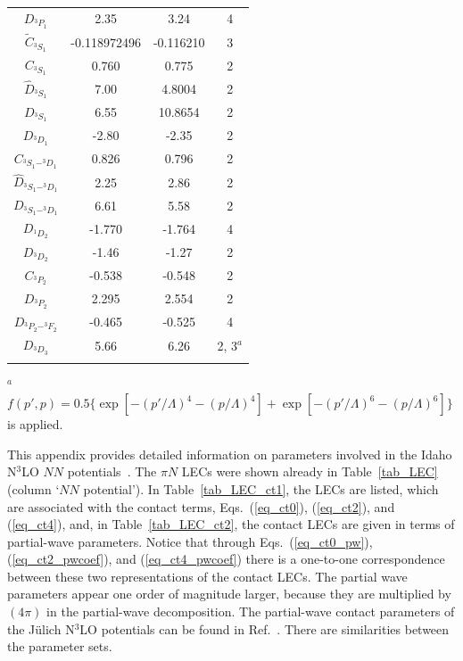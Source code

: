 \documentclass[sort&compress,preprint,3p]{elsarticle}
\begin{document}
\begin{table}[t]
\begin{tabular*}{\textwidth}{@{\extracolsep{\fill}}cccc}
  $D_{^3P_1}$   & 2.35     & 3.24 & 4 \\
 $\widetilde{C}_{^3S_1}$   &-0.118972496 & -0.116210 & 3 \\
  $C_{^3S_1}$   & 0.760    & 0.775 & 2 \\
 $\widehat{D}_{^3S_1}$    & 7.00    & 4.8004 &  2 \\
  $D_{^3S_1}$   & 6.55     & 10.8654 & 2 \\
  $D_{^3D_1}$   &-2.80    & -2.35 &  2 \\
  $C_{^3S_1-^3D_1}$  &0.826    & 0.796 & 2 \\
  $\widehat{D}_{^3S_1-^3D_1}$  &2.25    & 2.86 & 2 \\
  $D_{^3S_1-^3D_1}$  &6.61     & 5.58 & 2 \\
  $D_{^1D_2}$   &-1.770     & -1.764 & 4 \\
  $D_{^3D_2}$   &-1.46   & -1.27 &  2 \\
  $C_{^3P_2}$   &-0.538  & -0.548 &  2 \\
  $D_{^3P_2}$   & 2.295  & 2.554 &  2 \\
  $D_{^3P_2-^3F_2}$ &-0.465   & -0.525 & 4 \\
  $D_{^3D_3}$   & 5.66     &6.26 & 2, 3$^a$  \\ 
\hline
\hline
\noalign{\smallskip}
\end{tabular*}
\footnotesize
$^a$  $f(p',p) = 0.5 \{ \exp[-(p'/\Lambda)^{4}-(p/\Lambda)^{4}] 
+ \exp[-(p'/\Lambda)^{6}-(p/\Lambda)^{6}] \}$
is applied.
\end{table}



This appendix provides detailed information on parameters involved
in the Idaho N$^3$LO $NN$ potentials~\cite{EM03}.
The $\pi N$ LECs were shown already in Table~\ref{tab_LEC} (column `$NN$ potential').
In Table~\ref{tab_LEC_ct1}, the LECs are listed, which are associated with the contact terms,
Eqs.~(\ref{eq_ct0}), (\ref{eq_ct2}), and (\ref{eq_ct4}), and,
in Table~\ref{tab_LEC_ct2}, the contact LECs are given in terms of partial-wave parameters.
Notice that through Eqs.~(\ref{eq_ct0_pw}), (\ref{eq_ct2_pwcoef}), and (\ref{eq_ct4_pwcoef})
there is a one-to-one correspondence between these two representations of the
contact LECs. 
The partial wave parameters appear one order of magnitude larger, because they are
multiplied by $(4\pi)$ in the partial-wave decomposition.
The partial-wave contact parameters of the J\"ulich N$^3$LO potentials
can be found in Ref.~\cite{EGM05}. There are similarities between the parameter sets.
\end{document}
